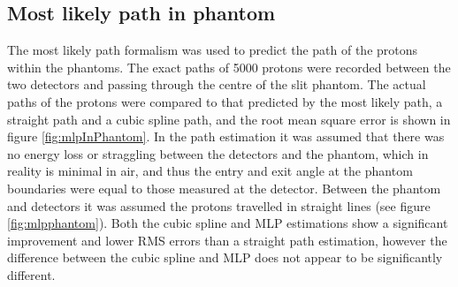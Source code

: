 \documentclass[11pt,a4paper]{article}
\begin{document}

\subsection{Most likely path in phantom}
The most likely path formalism was used to predict the path of the protons within the phantoms. The exact paths of 5000 protons were recorded between the two detectors and passing through the centre of the slit phantom. The actual paths of the protons were compared to that predicted by the most likely path, a straight path and a cubic spline path, and the root mean square error is shown in figure \ref{fig:mlpInPhantom}. In the path estimation it was assumed that there was no energy loss or straggling between the detectors and the phantom, which in reality is minimal in air, and thus the entry and exit angle at the phantom boundaries were equal to those measured at the detector. Between the phantom and detectors it was assumed the protons travelled in straight lines (see figure \ref{fig:mlpphantom}). Both the cubic spline and MLP estimations show a significant improvement and lower RMS errors than a straight path estimation, however the difference between the cubic spline and MLP does not appear to be significantly different.
\end{document}

